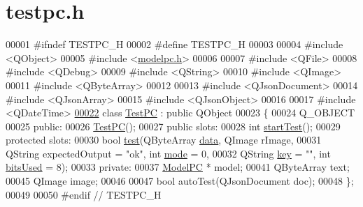 \hypertarget{testpc_8h_source}{}\section{testpc.\+h}
\label{testpc_8h_source}

\begin{DoxyCode}
00001 \textcolor{preprocessor}{#ifndef TESTPC\_H}
00002 \textcolor{preprocessor}{#define TESTPC\_H}
00003 
00004 \textcolor{preprocessor}{#include <QObject>}
00005 \textcolor{preprocessor}{#include <\mbox{\hyperlink{modelpc_8h}{modelpc.h}}>}
00006 
00007 \textcolor{preprocessor}{#include <QFile>}
00008 \textcolor{preprocessor}{#include <QDebug>}
00009 \textcolor{preprocessor}{#include <QString>}
00010 \textcolor{preprocessor}{#include <QImage>}
00011 \textcolor{preprocessor}{#include <QByteArray>}
00012 
00013 \textcolor{preprocessor}{#include <QJsonDocument>}
00014 \textcolor{preprocessor}{#include <QJsonArray>}
00015 \textcolor{preprocessor}{#include <QJsonObject>}
00016 
00017 \textcolor{preprocessor}{#include <QDateTime>}
\mbox{\hyperlink{class_test_p_c}{00022}} \textcolor{keyword}{class }\mbox{\hyperlink{class_test_p_c}{TestPC}} : \textcolor{keyword}{public} QObject
00023 \{
00024     Q\_OBJECT
00025 \textcolor{keyword}{public}:
00026     \mbox{\hyperlink{class_test_p_c_a65226eb54f1ff76639c9fb1e2013e430}{TestPC}}();
00027 \textcolor{keyword}{public} slots:
00028     \textcolor{keywordtype}{int} \mbox{\hyperlink{class_test_p_c_ad0d724439a65d183d3d336b667cb867b}{startTest}}();
00029 \textcolor{keyword}{protected} slots:
00030     \textcolor{keywordtype}{bool} \mbox{\hyperlink{class_test_p_c_a612a0409006417c6f03e1749bca0d45a}{test}}(QByteArray \mbox{\hyperlink{namespace_errors_dict_setup_af570460846fb9f0c91abd308a095dcdc}{data}}, QImage rImage,
00031               QString expectedOutput = \textcolor{stringliteral}{"ok"}, \textcolor{keywordtype}{int} \mbox{\hyperlink{namespacetests-setup_a04126d10edec6b3171e1b55a00309b23}{mode}} = 0,
00032               QString \mbox{\hyperlink{namespace_errors_dict_setup_a09c268098d09ffb8e5504f30fa6d5dd9}{key}} = \textcolor{stringliteral}{""}, \textcolor{keywordtype}{int} \mbox{\hyperlink{namespacetests-setup_a64974eb034f518d24195739395783d3d}{bitsUsed}} = 8);
00033 \textcolor{keyword}{private}:
00037     \mbox{\hyperlink{class_model_p_c}{ModelPC}} * model;
00041     QByteArray text;
00045     QImage image;
00046 
00047     \textcolor{keywordtype}{bool} autoTest(QJsonDocument doc);
00048 \};
00049 
00050 \textcolor{preprocessor}{#endif // TESTPC\_H}
\end{DoxyCode}
